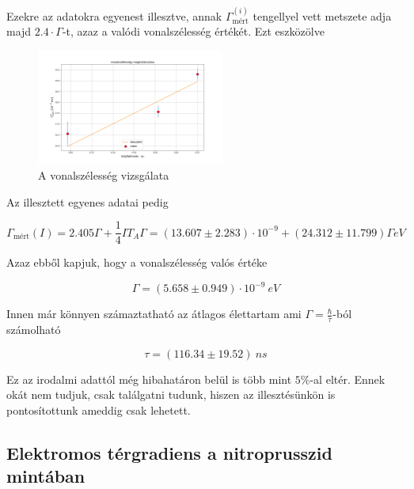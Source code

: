 \documentclass[a4paper,12pt]{article}
\begin{document}
\par Ezekre az adatokra egyenest illesztve, annak $\Gamma_{\text{mért}}^{(i)}$ tengellyel vett metszete adja majd $2.4\cdot\Gamma$-t, azaz a valódi vonalszélesség értékét. Ezt eszközölve

\begin{figure}[!htb]
\centering
\includegraphics[width=0.55\textwidth]{vonalszelesseg.png}
\caption{A vonalszélesség vizsgálata}
\end{figure}

\par Az illesztett egyenes adatai pedig

\begin{equation*}
\Gamma_{\text{mért}}(I) = 2.405\Gamma + \frac{1}{4}IT_{A}\Gamma = (13.607 \pm 2.283)\cdot 10^{-9} + (24.312 \pm 11.799)\Gamma eV
\end{equation*}

\par Azaz ebből kapjuk, hogy a vonalszélesség valós értéke

\begin{equation*}
	\Gamma = (5.658 \pm 0.949)\cdot 10^{-9} ~eV
\end{equation*}

\par Innen már könnyen számaztatható az átlagos élettartam ami $\Gamma = \frac{\hbar}{\tau}$-ból számolható

\begin{equation*}
	\tau = (116.34 \pm 19.52) ~ns
\end{equation*}

\par Ez az irodalmi adattól még hibahatáron belül is több mint $5\%$-al eltér. Ennek okát nem tudjuk, csak találgatni tudunk, hiszen az illesztésünkön is pontosítottunk ameddig csak lehetett.

\subsection{Elektromos térgradiens a nitroprusszid mintában}
\end{document}
